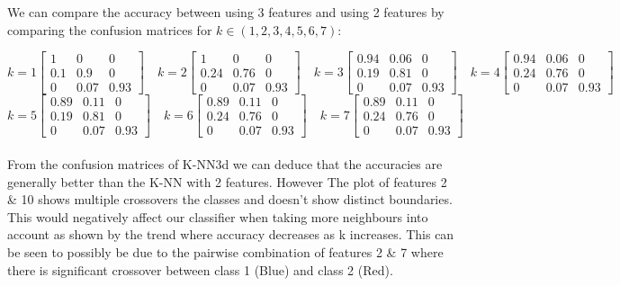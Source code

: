\documentclass[11pt]{article}
\begin{document}
\noindent
We can compare the accuracy between using 3 features and using 2 features by comparing the confusion matrices for $k \in (1,2,3,4,5,6,7)$:

$$
k=1
\begin{bmatrix} 
1 & 0 & 0\\
0.1 & 0.9 & 0\\
0 & 0.07 & 0.93
\end{bmatrix}
\quad
k=2
\begin{bmatrix} 
1 & 0 & 0\\
0.24 & 0.76 & 0\\
0 & 0.07 & 0.93
\end{bmatrix}
\quad
k=3
\begin{bmatrix} 
0.94 & 0.06 & 0\\
0.19 & 0.81 & 0\\
0 & 0.07 & 0.93
\end{bmatrix}
\quad
k=4
\begin{bmatrix} 
0.94 & 0.06 & 0\\
0.24 & 0.76 & 0\\
0 & 0.07 & 0.93
\end{bmatrix}
$$
$$
k=5
\begin{bmatrix} 
0.89 & 0.11 & 0\\
0.19 & 0.81 & 0\\
0 & 0.07 & 0.93
\end{bmatrix}
\quad
k=6
\begin{bmatrix} 
0.89 & 0.11 & 0\\
0.24 & 0.76 & 0\\
0 & 0.07 & 0.93
\end{bmatrix}
\quad
k=7
\begin{bmatrix} 
0.89 & 0.11 & 0\\
0.24 & 0.76 & 0\\
0 & 0.07 & 0.93
\end{bmatrix}
\quad
$$
\noindent
\\
\noindent
From the confusion matrices of K-NN3d we can deduce that the accuracies are generally better than the K-NN with 2 features. However  The plot of features 2 \& 10 shows multiple crossovers the classes and doesn’t show distinct boundaries. This would negatively affect our classifier when taking more neighbours into account as shown by the trend where accuracy decreases as k increases. This can be seen to possibly be due to the pairwise combination of features 2 \& 7 where there is significant crossover between class 1 (Blue) and class 2 (Red).
\end{document}
